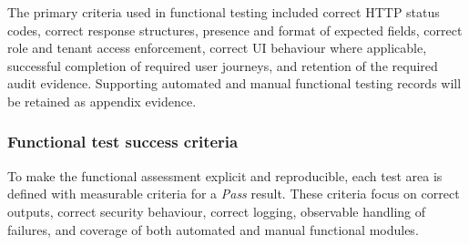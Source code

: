 The primary criteria used in functional testing included correct HTTP status
codes, correct response structures, presence and format of expected fields,
correct role and tenant access enforcement, correct UI behaviour where
applicable, successful completion of required user journeys, and retention of
the required audit evidence. Supporting automated and manual functional
testing records will be retained as appendix evidence.

\subsubsection{Functional test success criteria}

To make the functional assessment explicit and reproducible, each test area is
defined with measurable criteria for a \textit{Pass} result. These criteria
focus on correct outputs, correct security behaviour, correct logging,
observable handling of failures, and coverage of both automated and manual
functional modules.

